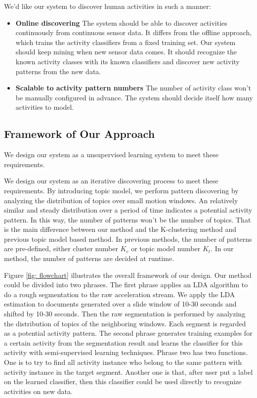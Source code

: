 \documentclass{sigchi}
\begin{document}
    We'd like our system to discover human activities in such a manner:
    \begin{itemize}
        \item \textbf{Online discovering}
        The system should be able to discover activities continuously from continuous sensor data.
        It differs from the offline approach, which trains the activity classifiers from a fixed training set.
        Our system should keep mining when new sensor data comes.
        It should recognize the known activity classes with its known classifiers and discover new activity patterns from the new data.

        \item \textbf{Scalable to activity pattern numbers}
        The number of activity class won't be manually configured in advance.
        The system should decide itself how many activities to model.

    \end{itemize}

\subsection{Framework of Our Approach}

    We design our system as a unsupervised learning system to meet these requirements.
    
    We design our system as an iterative discovering process to meet these requirements.
    By introducing topic model, we perform pattern discovering by analyzing the distribution of topics over small motion windows.
    An relatively similar and steady distribution over a period of time indicates a potential activity pattern.
    In this way, the number of patterns won't be the number of topics.
    That is the main difference between our method and the K-clustering method and previous topic model based method.
    In previous methods, the number of patterns are pre-defined, either cluster number $K_c$ or topic model number $K_t$.
    In our method, the number of patterns are decided at runtime.

    Figure \ref{fig: flowchart} illustrates the overall framework of our design.
    Our method could be divided into two phrases.
    The first phrase applies an LDA algorithm to do a rough segmentation to the raw acceleration stream.
    We apply the LDA estimation to documents generated over a slide window of 10-30 seconds and shifted by 10-30 seconds.
    Then the raw segmentation is performed by analyzing the distribution of topics of the neighboring windows.
    Each segment is regarded as a potential activity pattern.
    The second phrase generates training examples for a certain activity from the segmentation result and learns the classifier for this activity with semi-supervised learning techniques.
    Phrase two has two functions.
    One is to try to find all activity instance who belong to the same pattern with activity instance in the target segment.
    Another one is that, after user put a label on the learned classifier, then this classifier could be used directly to recognize activities on new data.
\end{document}
